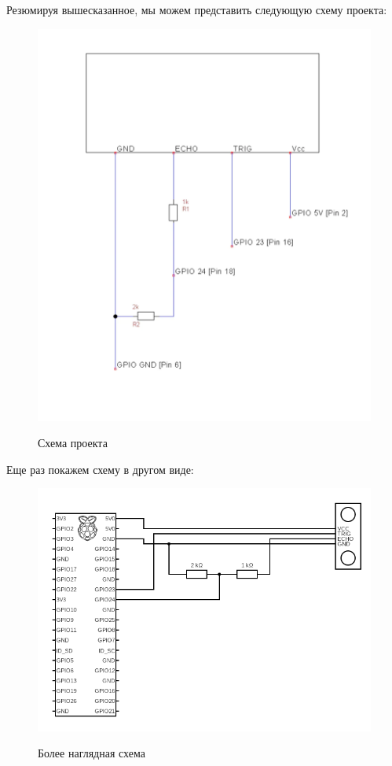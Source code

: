 \documentclass[a4paper, 14pt]{article}
\begin{document}
Резюмируя вышесказанное, мы можем представить следующую схему проекта:

\begin{figure}[H]
	\centering
	\includegraphics[width=12cm]{screenshots/3.png}\\
	\caption{Схема проекта}
\end{figure}

Еще раз покажем схему в другом виде:

\begin{figure}[H]
	\centering
	\includegraphics[width=12cm]{screenshots/5.png}\\
	\caption{Более наглядная схема}
\end{figure}
\end{document}
